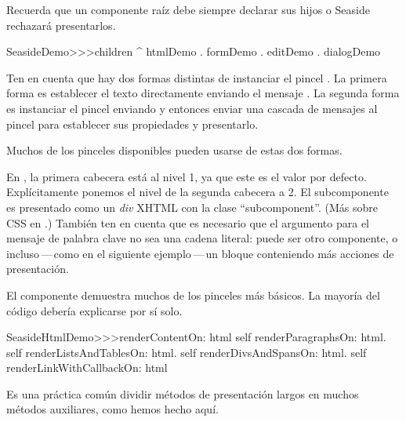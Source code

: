\documentclass[a4paper,10pt,twoside]{book}
\begin{document}
\noindent
Recuerda que un componente raíz debe siempre declarar sus hijos o Seaside rechazará presentarlos.
\begin{code}{}
SeasideDemo>>>children
	^ { htmlDemo . formDemo . editDemo . dialogDemo }
\end{code}

Ten en cuenta que hay dos formas distintas de instanciar el pincel .
La primera forma es establecer el texto directamente enviando el mensaje .
La segunda forma es instanciar el pincel enviando  y entonces enviar una cascada de mensajes al pincel para establecer sus propiedades y presentarlo.

Muchos de los pinceles disponibles pueden usarse de estas dos formas.


En , la primera cabecera está al nivel 1, ya que este es el valor por defecto.
Explícitamente ponemos el nivel de la segunda cabecera a 2.
El subcomponente es presentado como un \emph{div} XHTML con la clase  ``subcomponent''.
(Más sobre CSS en .)
También ten en cuenta que es necesario que el argumento para el mensaje de palabra clave  no sea una cadena literal: puede ser otro componente, o incluso\,---\,como en el siguiente ejemplo\,---\,un bloque conteniendo más acciones de presentación.

El componente  demuestra muchos de los pinceles más básicos.
La mayoría del código debería explicarse por sí solo.

\begin{code}{}
SeasideHtmlDemo>>>renderContentOn: html 
	self renderParagraphsOn: html.
	self renderListsAndTablesOn: html.
	self renderDivsAndSpansOn: html.
	self renderLinkWithCallbackOn: html
\end{code}

Es una práctica común dividir métodos de presentación largos en muchos métodos auxiliares, como hemos hecho aquí.

\end{document}
